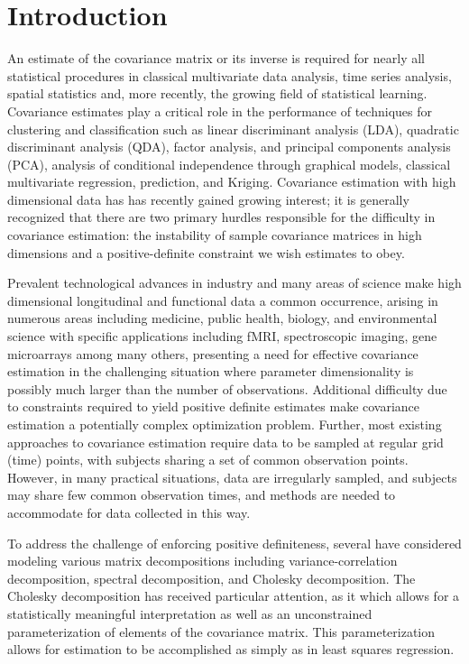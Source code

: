 \documentclass[12pt]{article}
\theoremstyle{definition}
\begin{document}
\section{Introduction}

An estimate of the covariance matrix or its inverse is required for nearly all statistical procedures in classical multivariate data analysis, time series analysis, spatial statistics and, more recently, the growing field of statistical learning. Covariance estimates play a critical role in the performance of techniques for clustering and classification such as linear discriminant analysis (LDA), quadratic discriminant analysis (QDA), factor analysis, and principal components analysis (PCA), analysis of conditional independence through graphical models, classical multivariate regression, prediction, and Kriging. Covariance estimation with high dimensional data has has recently gained growing interest; it is generally recognized that there are two primary hurdles responsible for the difficulty in covariance estimation: the instability of sample covariance matrices in high dimensions and a positive-definite constraint we wish estimates to obey.

Prevalent technological advances in industry and many areas of science make high dimensional longitudinal and functional data a common occurrence, arising in numerous areas including medicine, public health, biology, and environmental science with specific applications including fMRI, spectroscopic imaging, gene microarrays among many others, presenting a need for effective covariance estimation in the challenging situation where parameter dimensionality is possibly much larger than the number of observations. Additional difficulty due to constraints required to yield positive definite estimates make covariance estimation a potentially complex optimization problem. Further, most existing approaches to covariance estimation require data to be sampled at regular grid (time) points, with subjects sharing a set of common observation points. However, in many practical situations, data are irregularly sampled, and subjects may share few common observation times, and methods are needed to accommodate for data collected in this way.  

To address the challenge of enforcing positive definiteness, several have considered modeling various matrix decompositions including variance-correlation decomposition, spectral decomposition, and Cholesky decomposition. The Cholesky decomposition has received particular attention, as it which allows for a statistically meaningful interpretation as well as an unconstrained parameterization of elements of the covariance matrix. This parameterization allows for estimation to be accomplished as simply as in least squares regression. 
\end{document}
